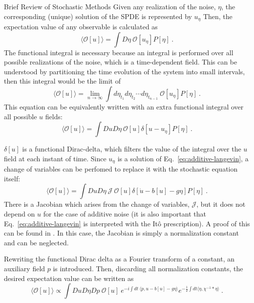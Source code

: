 \begin{chapter}{Brief Review of Stochastic Methods}
Given any realization of the noise, $\eta$, the corresponding
(unique) solution of the SPDE is represented by $u_{\eta}$
Then, the expectation value of any observable is calculated as
\begin{equation}
    \langle \mathcal{O}[u] \rangle =
    \int D \eta \ \mathcal{O}[u_{\eta}] P[\eta] \ .
\end{equation}
The functional integral is necessary because an integral is performed
over all possible realizations of the noise, which is a time-dependent
field. This can be understood by
partitioning the time evolution of the system into small intervals,
then this integral would be the limit of
\begin{equation}
    \langle \mathcal{O}[u] \rangle =
    \lim_{n \to \infty}
    \int d \eta_{t_1} d\eta_{t_2} \cdots d\eta_{t_{n-1}}
    \ \mathcal{O}[u_{\eta}] P[\eta] \ .
\end{equation}
This equation can be equivalently written with an extra
functional integral over all possible $u$ fields:
\begin{equation}
    \langle \mathcal{O}[u] \rangle =
    \int Du D\eta \ \mathcal{O}[u] \delta[u - u_{\eta}] P[\eta] \ .
\end{equation}

$\delta[u]$ is a functional Dirac-delta, which
filters the value of the integral over the $u$ field
at each instant of time.
Since $u_{\eta}$ is a solution of Eq.~\eqref{eq:additive-langevin},
a change of variables can be perfomed to replace it
with the stochastic equation itself:
\begin{equation}
    \langle \mathcal{O}[u] \rangle =
    \int Du D\eta \ \mathcal{J} \ \mathcal{O}[u] \delta[\dot u - b[u] - g \eta] P[\eta] \ .
\end{equation}
There is a Jacobian which arises from the change of variables, $\mathcal{J}$,
but it does not depend on $u$ for the case of additive noise
(it is also important that Eq.~\eqref{eq:additive-langevin}
is interpreted with the Itô prescription).
A proof of this can be found in \textcite{nakazato1990symmetries}.
In this case, the Jacobian is simply a normalization constant and can be neglected.

Rewriting the functional Dirac delta as a Fourier transform of a constant, an auxiliary field $p$ is introduced. Then,
discarding all normalization constants, the desired expectation
value can be written as
\begin{equation}
    \langle \mathcal{O}[u] \rangle \propto
    \int Du D\eta Dp \  \mathcal{O}[u] \
    e^{-i \int dt \ \langle p, u - b[u] - g \eta \rangle}
    e^{-\frac12 \int dt \langle \eta, \chi^{-1} * \eta \rangle } \ .
\end{equation}


\end{chapter}
